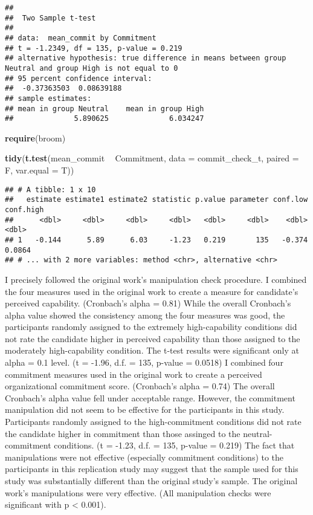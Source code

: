 \documentclass[]{article}
\newenvironment{Shaded}{\begin{snugshade}}{\end{snugshade}}
\newcommand{\DataTypeTok}[1]{\textcolor[rgb]{0.13,0.29,0.53}{#1}}
\newcommand{\KeywordTok}[1]{\textcolor[rgb]{0.13,0.29,0.53}{\textbf{#1}}}
\newcommand{\NormalTok}[1]{#1}
\newcommand{\OperatorTok}[1]{\textcolor[rgb]{0.81,0.36,0.00}{\textbf{#1}}}
\newcommand{\StringTok}[1]{\textcolor[rgb]{0.31,0.60,0.02}{#1}}
\begin{document}
\begin{verbatim}
## 
##  Two Sample t-test
## 
## data:  mean_commit by Commitment
## t = -1.2349, df = 135, p-value = 0.219
## alternative hypothesis: true difference in means between group Neutral and group High is not equal to 0
## 95 percent confidence interval:
##  -0.37363503  0.08639188
## sample estimates:
## mean in group Neutral    mean in group High 
##              5.890625              6.034247
\end{verbatim}

\begin{Shaded}
\begin{Highlighting}[]
\KeywordTok{require}\NormalTok{(broom)}

\KeywordTok{tidy}\NormalTok{(}\KeywordTok{t.test}\NormalTok{(mean_commit }\OperatorTok{~}\StringTok{ }\NormalTok{Commitment, }\DataTypeTok{data =}\NormalTok{ commit_check_t, }\DataTypeTok{paired =}\NormalTok{ F, }\DataTypeTok{var.equal =}\NormalTok{ T))}
\end{Highlighting}
\end{Shaded}

\begin{verbatim}
## # A tibble: 1 x 10
##   estimate estimate1 estimate2 statistic p.value parameter conf.low conf.high
##      <dbl>     <dbl>     <dbl>     <dbl>   <dbl>     <dbl>    <dbl>     <dbl>
## 1   -0.144      5.89      6.03     -1.23   0.219       135   -0.374    0.0864
## # ... with 2 more variables: method <chr>, alternative <chr>
\end{verbatim}

I precisely followed the original work's manipulation check procedure. I
combined the four measures used in the original work to create a measure
for candidate's perceived capability. (Cronbach's alpha = 0.81) While
the overall Cronbach's alpha value showed the consistency among the four
measures was good, the participants randomly assigned to the extremely
high-capability conditions did not rate the candidate higher in
perceived capability than those assigned to the moderately
high-capability condition. The t-test results were significant only at
alpha = 0.1 level. (t = -1.96, d.f. = 135, p-value = 0.0518) I combined
four commitment measures used in the original work to create a perceived
organizational commitment score. (Cronbach's alpha = 0.74) The overall
Cronbach's alpha value fell under acceptable range. However, the
commitment manipulation did not seem to be effective for the
participants in this study. Participants randomly assigned to the
high-commitment conditions did not rate the candidate higher in
commitment than those assinged to the neutral-commitment conditions. (t
= -1.23, d.f. = 135, p-value = 0.219) The fact that manipulations were
not effective (especially commitment conditions) to the participants in
this replication study may suggest that the sample used for this study
was substantially different than the original study's sample. The
original work's manipulations were very effective. (All manipulation
checks were significant with p \textless{} 0.001).\\
\end{document}
